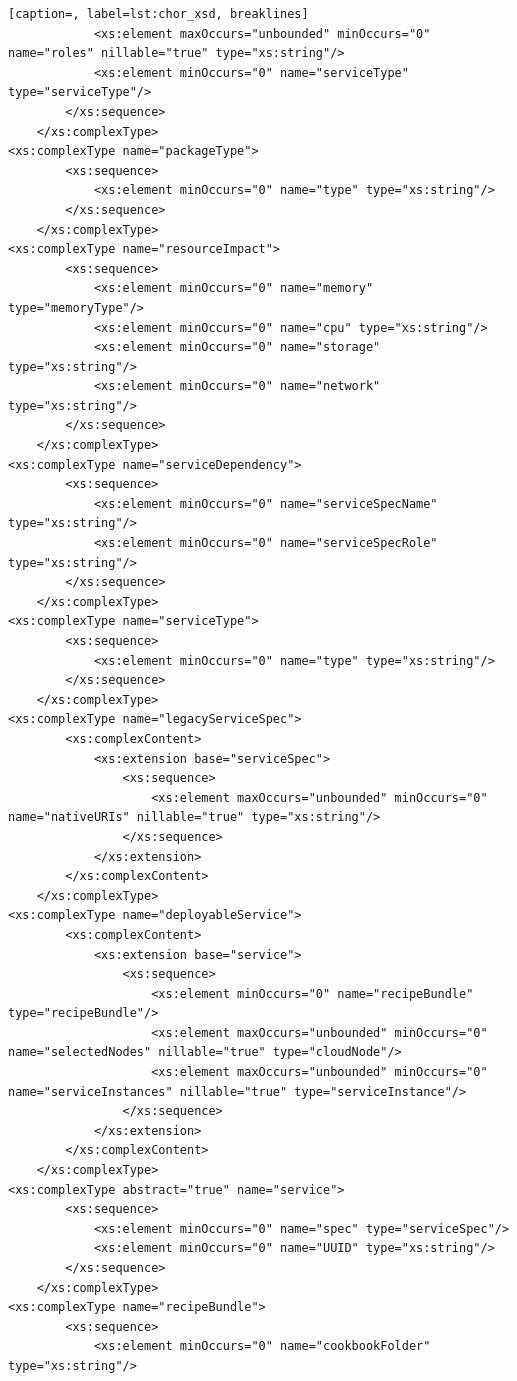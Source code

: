 {\begin{lstlisting}[caption=, label=lst:chor_xsd, breaklines]
            <xs:element maxOccurs="unbounded" minOccurs="0" name="roles" nillable="true" type="xs:string"/>
            <xs:element minOccurs="0" name="serviceType" type="serviceType"/>
        </xs:sequence>
    </xs:complexType>
<xs:complexType name="packageType">
        <xs:sequence>
            <xs:element minOccurs="0" name="type" type="xs:string"/>
        </xs:sequence>
    </xs:complexType>
<xs:complexType name="resourceImpact">
        <xs:sequence>
            <xs:element minOccurs="0" name="memory" type="memoryType"/>
            <xs:element minOccurs="0" name="cpu" type="xs:string"/>
            <xs:element minOccurs="0" name="storage" type="xs:string"/>
            <xs:element minOccurs="0" name="network" type="xs:string"/>
        </xs:sequence>
    </xs:complexType>
<xs:complexType name="serviceDependency">
        <xs:sequence>
            <xs:element minOccurs="0" name="serviceSpecName" type="xs:string"/>
            <xs:element minOccurs="0" name="serviceSpecRole" type="xs:string"/>
        </xs:sequence>
    </xs:complexType>
<xs:complexType name="serviceType">
        <xs:sequence>
            <xs:element minOccurs="0" name="type" type="xs:string"/>
        </xs:sequence>
    </xs:complexType>
<xs:complexType name="legacyServiceSpec">
        <xs:complexContent>
            <xs:extension base="serviceSpec">
                <xs:sequence>
                    <xs:element maxOccurs="unbounded" minOccurs="0" name="nativeURIs" nillable="true" type="xs:string"/>
                </xs:sequence>
            </xs:extension>
        </xs:complexContent>
    </xs:complexType>
<xs:complexType name="deployableService">
        <xs:complexContent>
            <xs:extension base="service">
                <xs:sequence>
                    <xs:element minOccurs="0" name="recipeBundle" type="recipeBundle"/>
                    <xs:element maxOccurs="unbounded" minOccurs="0" name="selectedNodes" nillable="true" type="cloudNode"/>
                    <xs:element maxOccurs="unbounded" minOccurs="0" name="serviceInstances" nillable="true" type="serviceInstance"/>
                </xs:sequence>
            </xs:extension>
        </xs:complexContent>
    </xs:complexType>
<xs:complexType abstract="true" name="service">
        <xs:sequence>
            <xs:element minOccurs="0" name="spec" type="serviceSpec"/>
            <xs:element minOccurs="0" name="UUID" type="xs:string"/>
        </xs:sequence>
    </xs:complexType>
<xs:complexType name="recipeBundle">
        <xs:sequence>
            <xs:element minOccurs="0" name="cookbookFolder" type="xs:string"/>

\end{lstlisting}}
